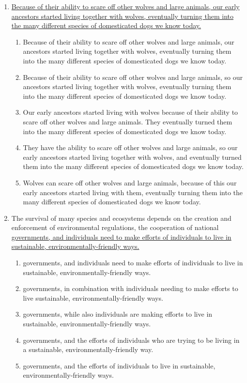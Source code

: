 \documentclass[12pt]{book}
\begin{document}
\begin{enumerate}
\bigskip
\item \ul{Because of their ability to scare off other wolves and large animals, our early ancestors started living together with wolves, eventually turning them into the many different species of domesticated dogs we know today.}

\begin{enumerate}[label=(\Alph*)]
\item Because of their ability to scare off other wolves and large animals, our ancestors started living together with wolves, eventually turning them into the many different species of domesticated dogs we know today.
\item Because of their ability to scare off other wolves and large animals, so our ancestors started living together with wolves, eventually turning them into the many different species of domesticated dogs we know today.
\item Our early ancestors started living with wolves because of their ability to scare off other wolves and large animals.  They eventually turned them into the many different species of domesticated dogs we know today.
\item They have the ability to scare off other wolves and large animals, so our early ancestors started living together with wolves, and eventually turned them into the many different species of domesticated dogs we know today.
\item Wolves can scare off other wolves and large animals, because of this our early ancestors started living with  them, eventually turning them into the many different species of domesticated dogs we know today.
\end{enumerate}

\newpage
\item The survival of many species and ecosystems depends on the creation and enforcement of environmental regulations, the cooperation of national \ul{governments, and individuals need to make efforts of individuals to live in sustainable, environmentally-friendly ways.}

\begin{enumerate}[label=(\Alph*)]
\item governments, and individuals need to make efforts of individuals to live in sustainable, environmentally-friendly ways.   
\item governments, in combination with individuals needing to make efforts to live sustainable, environmentally-friendly ways.
\item governments, while also individuals are making efforts to live in sustainable, environmentally-friendly ways.
\item governments, and the efforts of individuals who are trying to be living in a sustainable, environmentally-friendly way.
\item governments, and the efforts of individuals to live in sustainable, environmentally-friendly ways.   
\end{enumerate}


\end{enumerate}
\end{document}
